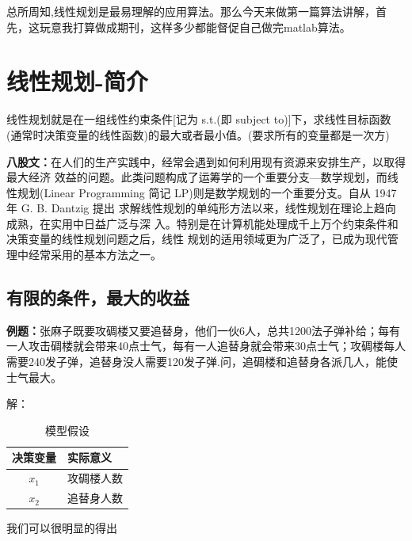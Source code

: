 \documentclass[a4paper,20pt]{article}
\title{}
\author{}
\date{}
\begin{document}
\renewcommand{\lstlistlistingname}{代码汇总}
\renewcommand{\lstlistingname}{代码}
\renewcommand\tablename{表}
    总所周知,线性规划是最易理解的应用算法。那么今天来做第一篇算法讲解，首先，这玩意我打算做成期刊，这样多少都能督促自己做完matlab算法。
    \section{线性规划-简介}
    线性规划就是在一组线性约束条件[记为 s.t.(即 subject to)]下，求线性目标函数(通常时决策变量的线性函数)的最大或者最小值。(要求所有的变量都是一次方)
    \par \textbf{八股文：}在人们的生产实践中，经常会遇到如何利用现有资源来安排生产，以取得最大经济
    效益的问题。此类问题构成了运筹学的一个重要分支—数学规划，而线性规划(Linear 
    Programming 简记 LP)则是数学规划的一个重要分支。自从 1947 年 G. B. Dantzig 提出
    求解线性规划的单纯形方法以来，线性规划在理论上趋向成熟，在实用中日益广泛与深
    入。特别是在计算机能处理成千上万个约束条件和决策变量的线性规划问题之后，线性
    规划的适用领域更为广泛了，已成为现代管理中经常采用的基本方法之一。
    \subsection{有限的条件，最大的收益}
    \par \textbf{例题：}张麻子既要攻碉楼又要追替身，他们一伙6人，总共1200法子弹补给；每有一人攻击碉楼就会带来40点士气，每有一人追替身就会带来30点士气；攻碉楼每人需要240发子弹，追替身没人需要120发子弹.问，追碉楼和追替身各派几人，能使士气最大。
   
    \par \small{解：}
    \begin{table}[h]
        
        \caption{模型假设}
        \centering
        \begin{tabular}{ c l }
        \hline
        决策变量 & 实际意义 \\
        \hline
        $x_1$ & 攻碉楼人数\\
        \hline
        $x_2$ & 追替身人数\\
        \hline
        \end{tabular}
    \end{table}
    \par 我们可以很明显的得出
    
\end{document}
